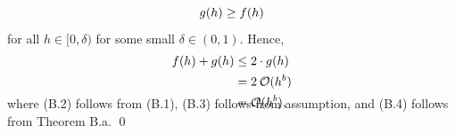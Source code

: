 \documentclass[11pt]{article}
\theoremstyle{break}
\numberwithin{equation}{theorem}
\begin{document}
\begin{enumerate}
    \begin{equation}
        g(h)\geq f(h) \vspace{-0.6em}
    \end{equation}
    for all $h\in[0 ,\delta)$ for some small $\delta\in(0, 1)$. Hence, \vspace{-0.6em}
    \begin{align}
        f(h)+g(h)&\leq 2\cdot g(h)\\
        &=2\:\mathcal{O}(h^b)\\
        &=\mathcal{O}(h^b),\\[-3.4em]\notag
    \end{align}
    where (B.2) follows from (B.1), (B.3) follows from assumption, and (B.4) follows from Theorem B.a. \qed
\end{enumerate}
\end{document}
